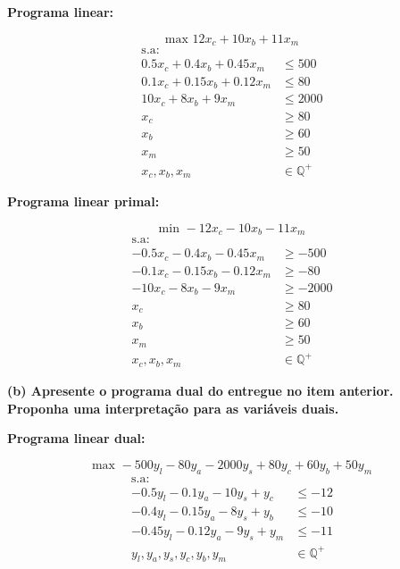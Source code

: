 \documentclass[
    12pt,
    a4paper,
    brazil,
    english
]{article}
\begin{document}
\textbf{Programa linear:}

\begin{equation}
    \text{max } 12x_c + 10x_b + 11x_m
\end{equation}
\begin{align}
    \text{s.a:} \nonumber \\
    0.5x_c + 0.4x_b + 0.45x_m &\leq 500 \\
    0.1x_c + 0.15x_b + 0.12x_m &\leq 80 \\
    10x_c + 8x_b + 9x_m &\leq 2000 \\
    x_c &\geq 80 \\
    x_b &\geq 60 \\
    x_m &\geq 50 \\
    x_c, x_b, x_m &\in \mathbb{Q}^+
\end{align}

\textbf{Programa linear primal:}

\begin{equation}
    \text{min } -12x_c - 10x_b - 11x_m
\end{equation}
\begin{align}
    \text{s.a:} \nonumber \\
    -0.5x_c - 0.4x_b - 0.45x_m &\geq -500 \\
    -0.1x_c - 0.15x_b - 0.12x_m &\geq -80 \\
    -10x_c - 8x_b - 9x_m &\geq -2000 \\
    x_c &\geq 80 \\
    x_b &\geq 60 \\
    x_m &\geq 50 \\
    x_c, x_b, x_m &\in \mathbb{Q}^+
\end{align}

\textbf{(b) Apresente o programa dual do entregue no item anterior. Proponha uma interpretação para as variáveis
duais.}

\textbf{Programa linear dual:}

\vspace{0.5cm}

\begin{equation}
    \text{max } -500y_l - 80y_a - 2000y_s +80y_c + 60y_b + 50y_m
\end{equation}
\begin{align}
    \text{s.a:} \nonumber \\
    -0.5y_l - 0.1y_a - 10y_s + y_c &\leq -12 \\
    -0.4y_l - 0.15y_a - 8y_s + y_b &\leq -10 \\
    -0.45y_l - 0.12y_a - 9y_s + y_m &\leq -11 \\
    y_l, y_a, y_s, y_c, y_b, y_m &\in \mathbb{Q}^+
\end{align}
\end{document}
